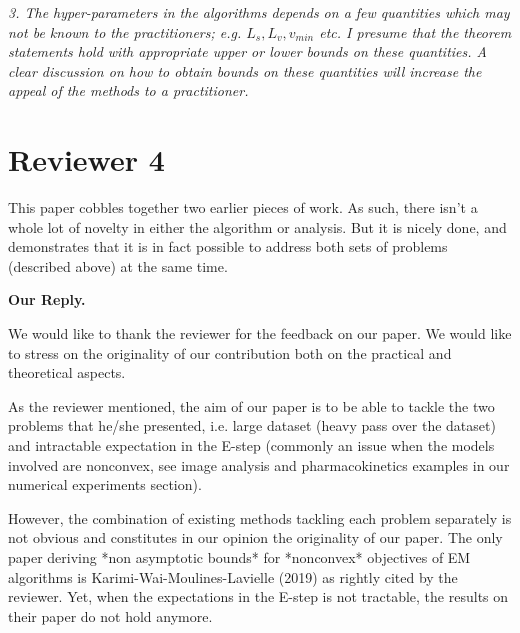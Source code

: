 \documentclass[anon,12pt]{alt2021} %
\begin{document}
\vspace{0.05in}
\textit{3. The hyper-parameters in the algorithms depends on a few quantities which may not be known to the practitioners; e.g. $L_s, L_v, v_{min}$ etc. I
presume that the theorem statements hold with appropriate upper or lower bounds on these quantities. A clear discussion on how to obtain
bounds on these quantities will increase the appeal of the methods to a practitioner.}
\vspace{0.05in}




\section{Reviewer 4}

This paper cobbles together two earlier pieces of work. As such, there isn't a whole lot of novelty in either the algorithm or analysis. But it is nicely done, and demonstrates that it is in fact possible to address both sets of problems (described above) at the same time.

\vspace{0.1in}
\textbf{Our Reply.}

We would like to thank the reviewer for the feedback on our paper. We would like to stress on the originality of our contribution both on the practical and theoretical aspects.

As the reviewer mentioned, the aim of our paper is to be able to tackle the two problems that he/she presented, i.e. large dataset (heavy pass over the dataset) and intractable expectation in the E-step (commonly an issue when the models involved are nonconvex, see image analysis and pharmacokinetics examples in our numerical experiments section).

However, the combination of existing methods tackling each problem separately is not obvious and constitutes in our opinion the originality of our paper.
The only paper deriving *non asymptotic bounds* for *nonconvex* objectives of EM algorithms is Karimi-Wai-Moulines-Lavielle (2019) as rightly cited by the reviewer.
Yet, when the expectations in the E-step is not tractable, the results on their paper do not hold anymore. 
\end{document}
